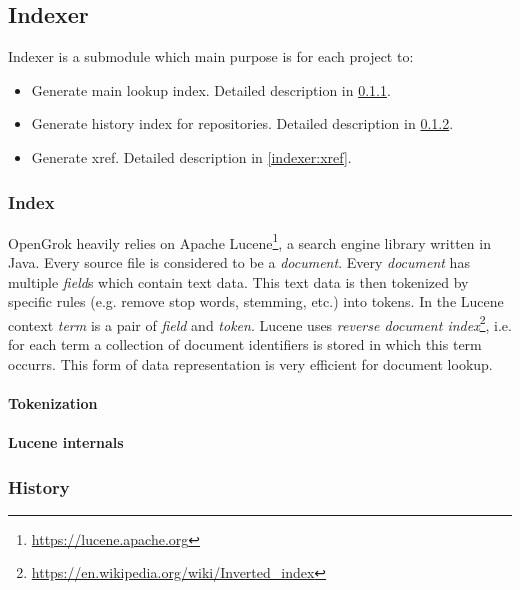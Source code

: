 \subsection{Indexer}
\label{indexer}

Indexer is a submodule which main purpose is for each project to:
\begin{itemize}
    \item Generate main lookup index. Detailed description in \ref{indexer:index}.
    \item Generate history index for repositories. Detailed description in \ref{indexer:history}.
    \item Generate xref. Detailed description in \ref{indexer:xref}.
\end{itemize}

\subsubsection{Index}
\label{indexer:index}

OpenGrok heavily relies on Apache Lucene\footnote{\url{https://lucene.apache.org}}, a search engine library
written in Java. Every source file is considered to be a \textit{document}. Every \textit{document} has multiple
\textit{field}s which contain text data. This text data is then tokenized by specific rules (e.g. remove stop words,
stemming, etc.) into tokens. In the Lucene context \textit{term} is a pair of \textit{field} and \textit{token}.
Lucene uses \textit{reverse document index}\footnote{\url{https://en.wikipedia.org/wiki/Inverted_index}},
i.e. for each term a collection of document identifiers is stored in which this term occurrs.
This form of data representation is very efficient for document lookup.

\paragraph{Tokenization}

\paragraph{Lucene internals}

\subsubsection{History}
\label{indexer:history}

